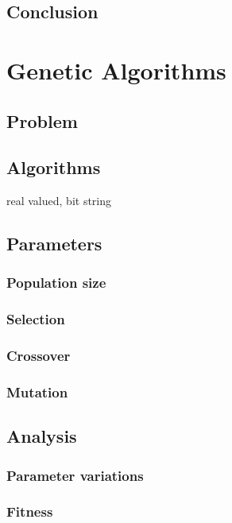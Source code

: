\documentclass{scrartcl}
\begin{document}
\subsection{Conclusion}



\section{Genetic Algorithms}

\subsection{Problem}

\subsection{Algorithms}
real valued, bit string

\subsection{Parameters}
\subsubsection{Population size}
\subsubsection{Selection}
\subsubsection{Crossover}
\subsubsection{Mutation}


\subsection{Analysis}

\subsubsection{Parameter variations}

\subsubsection{Fitness}
\end{document}
